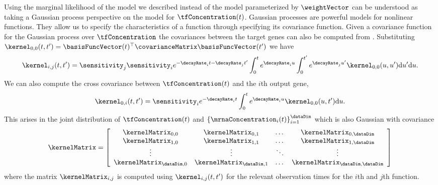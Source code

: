 \documentclass{article}
\begin{document}
Using the marginal likelihood of the model we described instead of the
model parameterized by $\weightVector$ can be understood as taking a
Gaussian process perspective on the model for
$\tfConcentration(t)$. Gaussian processes are powerful models for
nonlinear functions. They allow us to specify the characteristics of a
function through specifying its covariance function. Given a covariance function for the Gaussian process over $\tfConcentration$ the covariances between the target genes can also be computed from . Substituting $\kernel_{0,0}(t, t^\prime)=\basisFuncVector(t)^\top \covarianceMatrix \basisFuncVector(t^\prime)$ we have 
\[
\kernel_{i,j}(t,t^\prime) = \sensitivity_j\sensitivity_i e^{-\decayRate_{i}t-\decayRate_{j}t^\prime}\int_0^t
e^{\decayRate_{i}u} \int_0^{t^\prime} e^{\decayRate_{j}u^\prime}\kernel_{0,0}(u, u^\prime)\mathrm{d}u^\prime \mathrm{d}u.
\]
We can also compute the cross covariance between $\tfConcentration(t)$ and the $i$th output gene, 
\[
\kernel_{0,i}(t, t^\prime) = \sensitivity_i e^{-\decayRate_{i}t}\int_0^t
e^{\decayRate_{i}u} \kernel_{0,0}(u, t^\prime)\mathrm{d}u.
\]
This arises in the joint distribution of $\tfConcentration(t)$ and $\left\{\mrnaConcentration_i(t)\right\}_{i=1}^\dataDim$ which is also Gaussian with covariance 
\[
\kernelMatrix = \left[\begin{array}{cccc}
\kernelMatrix_{0, 0} & \kernelMatrix_{0, 1}& \dots &\kernelMatrix_{0,\dataDim}\\
\kernelMatrix_{1, 0} & \kernelMatrix_{1, 1}& \dots &\kernelMatrix_{1,\dataDim}\\
\vdots &\vdots &\ddots & \vdots\\
\kernelMatrix_{\dataDim, 0} & \kernelMatrix_{\dataDim,  1} & \dots & \kernelMatrix_{\dataDim, \dataDim}
\end{array}\right]
\] 
where the matrix $\kernelMatrix_{i, j}$ is computed using $\kernel_{i, j}(t, t^\prime)$ for the relevant observation times for the $i$th and $j$th function.
\end{document}
